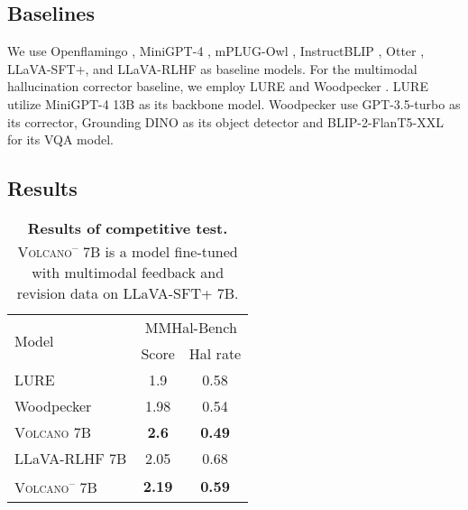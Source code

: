 \documentclass[11pt]{article}
\newcommand{\Ours}{\textsc{Volcano}}
\begin{document}
\subsection{Baselines}
\label{subsec:baselines}
We use Openflamingo \citep{awadalla2023openflamingo}, MiniGPT-4 \citep{zhu2023minigpt4}, mPLUG-Owl \citep{ye2023mplugowl}, InstructBLIP \citep{dai2023instructblip}, Otter \citep{li2023otter}, LLaVA-SFT+, and LLaVA-RLHF \citep{sun2023aligning} as baseline models. For the multimodal hallucination corrector baseline, we employ LURE \citep{zhou2023analyzing} and Woodpecker \citep{yin2023woodpecker}. LURE utilize MiniGPT-4 13B as its backbone model. Woodpecker use GPT-3.5-turbo as its corrector, Grounding DINO \citep{liu2023grounding} as its object detector and BLIP-2-FlanT5-XXL \citep{li2023blip2} for its VQA model.
\subsection{Results}
\label{subsec:results}
\begin{table}[t]
\centering
\small
\begin{tabular}{lcc}
\toprule
\multirow{2}{*}{Model} & \multicolumn{2}{c}{MMHal-Bench} \\
& Score  & Hal rate   \\
\midrule
LURE & 1.9 & 0.58  \\
Woodpecker & 1.98 & 0.54  \\
{\Ours} 7B  & \textbf{2.6} & \textbf{0.49} \\
\midrule
LLaVA-RLHF 7B & 2.05 & 0.68  \\
{\Ours}\textsuperscript{--} 7B  & \textbf{2.19} & \textbf{0.59}  \\
\bottomrule
\end{tabular}
\caption{\textbf{Results of competitive test.} {\Ours}\textsuperscript{--} 7B is a model fine-tuned with multimodal feedback and revision data on LLaVA-SFT+ 7B.}
\label{tab:Table2}
\end{table}
\end{document}
